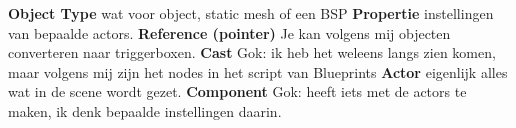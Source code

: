 \textbf{Object Type} \newline
wat voor object, static mesh of een BSP \newline
\textbf{Propertie} \newline
instellingen van bepaalde actors. \newline
\textbf{Reference (pointer)} \newline
Je kan volgens mij objecten converteren naar triggerboxen. \newline
\textbf{Cast} \newline
Gok: ik heb het weleens langs zien komen, maar volgens mij zijn het nodes in het script van Blueprints \newline
\textbf{Actor} \newline
eigenlijk alles wat in de scene wordt gezet. \newline
\textbf{Component} \newline
Gok: heeft iets met de actors te maken, ik denk bepaalde instellingen daarin.

